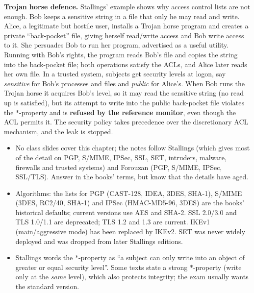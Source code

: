 \textbf{Trojan horse defence.} Stallings' example shows why access control lists are not enough. Bob keeps a sensitive string in a file that only he may read and write. Alice, a legitimate but hostile user, installs a Trojan horse program and creates a private ``back-pocket'' file, giving herself read/write access and Bob write access to it. She persuades Bob to run her program, advertised as a useful utility. Running with Bob's rights, the program reads Bob's file and copies the string into the back-pocket file; both operations satisfy the ACLs, and Alice later reads her own file. In a trusted system, subjects get security levels at logon, say \emph{sensitive} for Bob's processes and files and \emph{public} for Alice's. When Bob runs the Trojan horse it acquires Bob's level, so it may read the sensitive string (no read up is satisfied), but its attempt to write into the public back-pocket file violates the $*$-property and is \textbf{refused by the reference monitor}, even though the ACL permits it. The security policy takes precedence over the discretionary ACL mechanism, and the leak is stopped.

\begin{fixbox}
\begin{itemize}
  \item No class slides cover this chapter; the notes follow Stallings (which gives most of the detail on PGP, S/MIME, IPSec, SSL, SET, intruders, malware, firewalls and trusted systems) and Forouzan (PGP, S/MIME, IPSec, SSL/TLS). Answer in the books' terms, but know that the details have aged.
  \item Algorithms: the lists for PGP (CAST-128, IDEA, 3DES, SHA-1), S/MIME (3DES, RC2/40, SHA-1) and IPSec (HMAC-MD5-96, 3DES) are the books' historical defaults; current versions use AES and SHA-2. SSL 2.0/3.0 and TLS 1.0/1.1 are deprecated; TLS 1.2 and 1.3 are current. IKEv1 (main/aggressive mode) has been replaced by IKEv2. SET was never widely deployed and was dropped from later Stallings editions.
  \item Stallings words the $*$-property as ``a subject can only write into an object of greater or equal security level''. Some texts state a strong $*$-property (write only at the \emph{same} level), which also protects integrity; the exam usually wants the standard version.
\end{itemize}
\end{fixbox}

